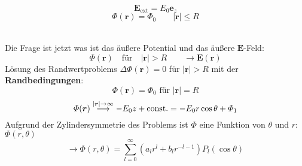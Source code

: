 \documentclass[titlepage,11pt,a4paper,ngerman]{report}
\newcommand{\tx}[1]{\textrm{#1}}
\newcommand{\const}{\tx{const.}}
\renewcommand{\Phi}{\varPhi}
\renewcommand{\vec}[1]{\boldsymbol{#1}}
\begin{document}
\begin{minipage}{.5\linewidth}
	\centering
	\vspace{5pt}
\end{minipage}%
\begin{minipage}{.5\linewidth}
	\begin{equation*}
	\vec{E}_{\tx{ext}} = E_0 \vec{e}_z
	\end{equation*}
	\begin{equation*}
	\Phi(\vec{r}) = \Phi_0 \qquad |\vec{r}| \le R
	\end{equation*}
\end{minipage}%
\\[5pt]
Die Frage ist jetzt was ist das äußere Potential und das äußere $ \vec{E} $-Feld:
\begin{equation*}
\Phi(\vec{r}) \quad \tx{für} \quad |\vec{r}| > R \qquad \rightarrow \vec{E}(\vec{r})
\end{equation*}
Lösung des Randwertproblems $ \Delta \Phi(\vec{r}) = 0 $ für $ |\vec{r}| > R $ mit der \textbf{Randbedingungen}:
$$ \Phi(\vec{r}) = \Phi_0 \tx{ für }  |\vec{r}| = R $$
$$ \Phi(\vec{r}) \buildrel |\vec{r}| \to \infty \over \longrightarrow - E_0 z + \const = - E_0 r \cos\theta + \Phi_1 $$
Aufgrund der Zylindersymmetrie des Problems ist $ \Phi $ eine Funktion von $ \theta $ und $ r $: $ \Phi(r,\theta) $
\begin{equation*}
\rightarrow \Phi(r,\theta) = \sum_{l=0}^{\infty} \left(a_l r^l + b_l r^{-l-1}\right) P_l(\cos\theta)
\end{equation*}
\end{document}
